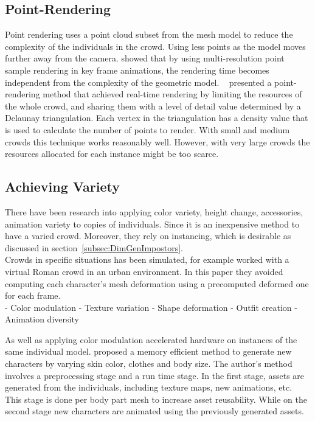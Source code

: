 \documentclass[6pt]{article} %
\begin{document}
\begin{multicols}{2}
\subsection{Point-Rendering}

Point rendering uses a point cloud subset from the mesh model to reduce the complexity of the individuals in the crowd.
Using less points as the model moves further away from the camera.
\cite{Wand2002} showed that by using multi-resolution point sample rendering in key frame animations, the rendering time becomes independent from the complexity of the geometric model.
~\cite{Larkin2010} presented a point-rendering method that achieved real-time rendering by limiting the resources of the whole crowd, and sharing them with a level of detail value determined by a Delaunay triangulation. 
Each vertex in the triangulation has a density value that is used to calculate the number of points to render.
With small and medium crowds this technique works reasonably well.
However, with very large crowds the resources allocated for each instance might be too scarce.

\subsection{Achieving Variety}

There have been research into applying color variety, height change, accessories, animation variety to copies of individuals.
Since it is an inexpensive method to have a varied crowd.
Moreover, they rely on instancing, which is desirable as discussed in section~\ref{subsec:DimGenImpostors}.\\

Crowds in specific situations has been simulated, for example \cite{deHeras2005} worked with a virtual Roman crowd in an urban environment.
In this paper they avoided computing each character’s mesh deformation using a precomputed deformed one for each frame.\\

- Color modulation
- Texture variation
- Shape deformation
- Outfit creation
- Animation diversity

As well as applying color modulation accelerated hardware on instances of the same individual model.
\cite{ruiz2013} proposed a memory efficient method to generate new characters by varying skin color, clothes and body size.
The author's method involves a preprocessing stage and a run time stage.
In the first stage, assets are generated from the individuals, including texture maps, new animations, etc.
This stage is done per body part mesh to increase asset reusability.
While on the second stage new characters are animated using the previously generated assets. 


\end{multicols}
\end{document}
